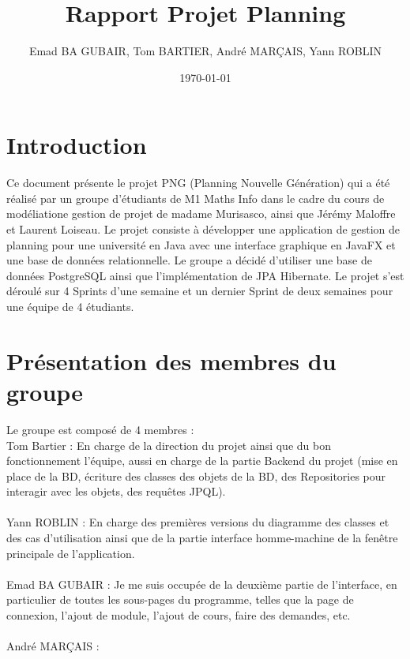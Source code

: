 \documentclass[a4paper,12pt]{article}
\title{Rapport Projet Planning}
\author{Emad BA GUBAIR, Tom BARTIER, André MARÇAIS, Yann ROBLIN}
\date{\today}
\begin{document}
\maketitle

\tableofcontents
\newpage
\section{Introduction}
Ce document présente le projet PNG (Planning Nouvelle Génération) qui a été réalisé par un groupe d'étudiants
de M1 Maths Info dans le cadre du cours de modéliatione gestion de projet de madame Murisasco, ainsi que 
Jérémy Maloffre et Laurent Loiseau. Le projet consiste à développer une application
de gestion de planning pour une université en Java avec une interface graphique en JavaFX et une base de données
relationnelle. Le groupe a décidé d'utiliser une base de données PostgreSQL ainsi que l'implémentation de JPA Hibernate.
Le projet s'est déroulé sur 4 Sprints d'une semaine et un dernier Sprint de deux semaines pour une équipe de 
4 étudiants.
\section{Présentation des membres du groupe}
Le groupe est composé de 4 membres :\\
Tom Bartier : En charge de la direction du projet ainsi que du bon fonctionnement l'équipe, aussi en charge de la partie
Backend du projet (mise en place de la BD, écriture des classes des objets de la BD, des Repositories pour interagir avec les objets, 
des requêtes JPQL).\\\\
Yann ROBLIN : En charge des premières versions du diagramme des classes et des cas d'utilisation ainsi que de la partie 
interface homme-machine de la fenêtre principale de l'application.
\\\\
Emad BA GUBAIR :   Je me suis occupée de la deuxième partie de l’interface, en particulier de toutes les sous-pages du programme, 
telles que la page de connexion, l’ajout de module, l’ajout de cours, faire des demandes, etc.\\\\
André MARÇAIS :  \\\\%
\end{document}
